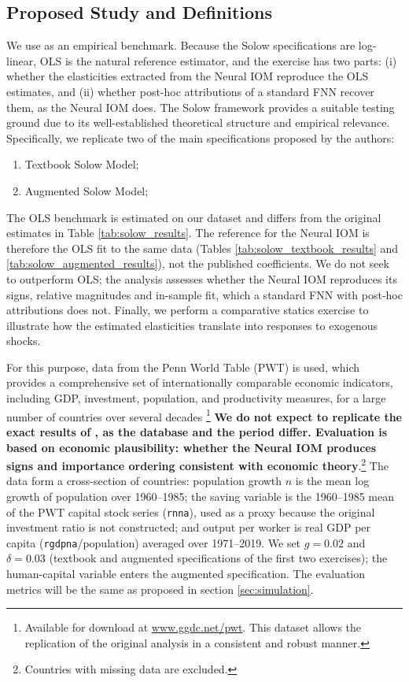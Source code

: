 \documentclass[preprint,12pt,authoryear]{sn-jnl}
\begin{document}
\subsection{Proposed Study and Definitions}

We use \cite{mankiw1992contribution} as an empirical benchmark. Because the Solow specifications are log-linear, OLS is the natural reference estimator, and the exercise has two parts: (i) whether the elasticities extracted from the Neural IOM reproduce the OLS estimates, and (ii) whether post-hoc attributions of a standard FNN recover them, as the Neural IOM does. The Solow framework provides a suitable testing ground due to its well-established theoretical structure and empirical relevance. Specifically, we replicate two of the main specifications proposed by the authors: 

\begin{enumerate} 
\item Textbook Solow Model; 
\item Augmented Solow Model; 
\end{enumerate}

The OLS benchmark is estimated on our dataset and differs from the original estimates in Table \ref{tab:solow_results}. The reference for the Neural IOM is therefore the OLS fit to the same data (Tables \ref{tab:solow_textbook_results} and \ref{tab:solow_augmented_results}), not the published coefficients. We do not seek to outperform OLS; the analysis assesses whether the Neural IOM reproduces its signs, relative magnitudes and in-sample fit, which a standard FNN with post-hoc attributions does not. Finally, we perform a comparative statics exercise to illustrate how the estimated elasticities translate into responses to exogenous shocks.

For this purpose, data from the Penn World Table (PWT) is used, which provides a comprehensive set of internationally comparable economic indicators, including GDP, investment, population, and productivity measures, for a large number of countries over several decades \citep{feenstra2015next}\footnote{Available for download at \url{www.ggdc.net/pwt}. This dataset allows the replication of the original analysis in a consistent and robust manner.} \textbf{We do not expect to replicate the exact results of \cite{mankiw1992contribution}, as the database and the period differ. Evaluation is based on economic plausibility: whether the Neural IOM produces signs and importance ordering consistent with economic theory}.\footnote{Countries with missing data are excluded.} The data form a cross-section of countries: population growth $n$ is the mean log growth of population over 1960--1985; the saving variable is the 1960--1985 mean of the PWT capital stock series (\texttt{rnna}), used as a proxy because the original investment ratio is not constructed; and output per worker is real GDP per capita (\texttt{rgdpna}/population) averaged over 1971--2019. We set $g=0.02$ and $\delta=0.03$ (textbook and augmented specifications of the first two exercises); the human-capital variable enters the augmented specification. The evaluation metrics will be the same as proposed in section \ref{sec:simulation}.
\end{document}
